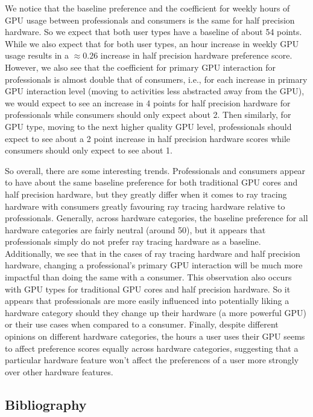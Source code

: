 \documentclass[
]{article}
\begin{document}
We notice that the baseline preference and the coefficient for weekly
hours of GPU usage between professionals and consumers is the same for
half precision hardware. So we expect that both user types have a
baseline of about 54 points. While we also expect that for both user
types, an hour increase in weekly GPU usage results in a
\(\approx 0.26\) increase in half precision hardware preference score.
However, we also see that the coefficient for primary GPU interaction
for professionals is almost double that of consumers, i.e., for each
increase in primary GPU interaction level (moving to activities less
abstracted away from the GPU), we would expect to see an increase in 4
points for half precision hardware for professionals while consumers
should only expect about 2. Then similarly, for GPU type, moving to the
next higher quality GPU level, professionals should expect to see about
a 2 point increase in half precision hardware scores while consumers
should only expect to see about 1.

So overall, there are some interesting trends. Professionals and
consumers appear to have about the same baseline preference for both
traditional GPU cores and half precision hardware, but they greatly
differ when it comes to ray tracing hardware with consumers greatly
favouring ray tracing hardware relative to professionals. Generally,
across hardware categories, the baseline preference for all hardware
categories are fairly neutral (around 50), but it appears that
professionals simply do not prefer ray tracing hardware as a baseline.
Additionally, we see that in the cases of ray tracing hardware and half
precision hardware, changing a professional's primary GPU interaction
will be much more impactful than doing the same with a consumer. This
observation also occurs with GPU types for traditional GPU cores and
half precision hardware. So it appears that professionals are more
easily influenced into potentially liking a hardware category should
they change up their hardware (a more powerful GPU) or their use cases
when compared to a consumer. Finally, despite different opinions on
different hardware categories, the hours a user uses their GPU seems to
affect preference scores equally across hardware categories, suggesting
that a particular hardware feature won't affect the preferences of a
user more strongly over other hardware features.

\hypertarget{bibliography}{%
\subsection{Bibliography}\label{bibliography}}
\end{document}
